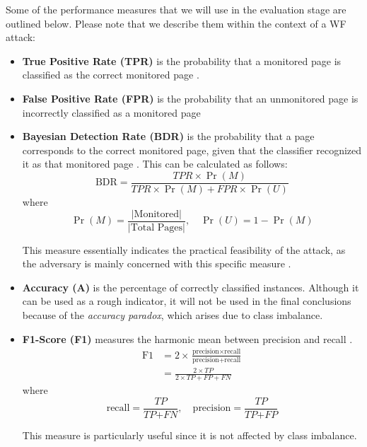 Some of the performance measures that we will use in the evaluation stage are outlined below.
Please note that we describe them within the context of a WF attack:
\begin{itemize}
  \item \textbf{True Positive Rate (TPR)} is the probability that a monitored page is classified as the correct monitored page \cite{kfingerprinting}.

  \item \textbf{False Positive Rate (FPR)} is the probability that an unmonitored page is incorrectly classified as a monitored page \cite{kfingerprinting}

  \item \textbf{Bayesian Detection Rate (BDR)} is the probability that a page corresponds to the correct monitored page, given that the classifier recognized it as that monitored page \cite{kfingerprinting}.
    This can be calculated as follows:
    $$\text{BDR} = \frac{\textit{TPR} \times \Pr(M)}{\textit{TPR} \times \Pr(M) + \textit{FPR} \times \Pr(U)}$$
    where
    $$\Pr(M) = \frac{|\text{Monitored}|}{|\text{Total Pages}|}, \quad \Pr(U) = 1 - \Pr(M)$$

    This measure essentially indicates the practical feasibility of the attack, as the adversary is mainly concerned with this specific measure \cite{kfingerprinting}.

  \item \textbf{Accuracy (A)} is the percentage of correctly classified instances.
    Although it can be used as a rough indicator, it will not be used in the final conclusions because of the \textit{accuracy paradox}, which arises due to class imbalance.

  \item \textbf{F1-Score (F1)} measures the harmonic mean between precision and recall \cite{scikitlearn}.
    \begin{align*}
      \text{F1} &= 2 \times \frac{\text{precision} \times \text{recall}}{\text{precision} + \text{recall}}\\
                &= \frac{2 \times \textit{TP}}{2 \times \textit{TP} + \textit{FP} + \textit{FN}}
    \end{align*}
    where
    $$\text{recall} = \frac{\textit{TP}}{\textit{TP} + \textit{FN}}, \quad \text{precision} = \frac{\textit{TP}}{\textit{TP} + \textit{FP}}$$

    This measure is particularly useful since it is not affected by class imbalance.
\end{itemize}

